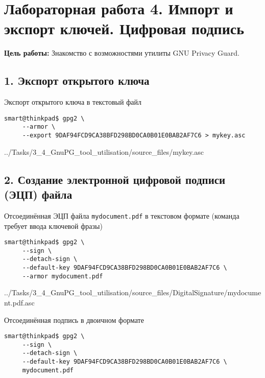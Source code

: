 \chapter*{Лабораторная работа 4. Импорт и экспорт ключей. Цифровая подпись}

\textbf{Цель работы:} Знакомство с возможностями утилиты GNU Privacy Guard.

\section*{1. Экспорт открытого ключа}

Экспорт открытого ключа в текстовый файл
\begin{Verbatim}[frame=single]
    smart@thinkpad$ gpg2 \
     --armor \
     --export 9DAF94FCD9CA38BFD298BD0CA0B01E0BAB2AF7C6 > mykey.asc
\end{Verbatim}


{../Tasks/3_4_GnuPG_tool_utilisation/source_files/mykey.asc}

\section*{2. Создание электронной цифровой подписи (ЭЦП) файла}

Отсоединённая ЭЦП файла \texttt{mydocument.pdf} в текстовом формате (команда требует ввода ключевой фразы)
\begin{Verbatim}[frame=single]
    smart@thinkpad$ gpg2 \
     --sign \
     --detach-sign \
     --default-key 9DAF94FCD9CA38BFD298BD0CA0B01E0BAB2AF7C6 \
     --armor mydocument.pdf
\end{Verbatim}


{../Tasks/3_4_GnuPG_tool_utilisation/source_files/DigitalSignature/mydocument.pdf.asc}

Отсоединённая подпись в двоичном формате

\begin{Verbatim}[frame=single]
    smart@thinkpad$ gpg2 \
     --sign \
     --detach-sign \
     --default-key 9DAF94FCD9CA38BFD298BD0CA0B01E0BAB2AF7C6 \
     mydocument.pdf
\end{Verbatim}

